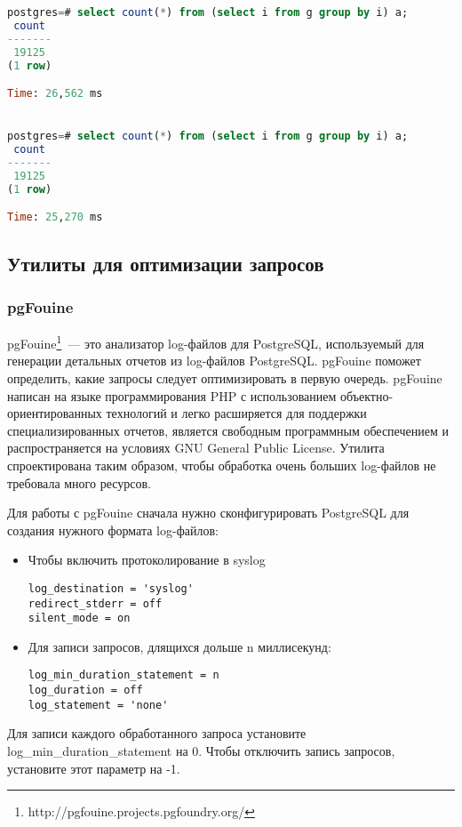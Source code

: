 \begin{lstlisting}[language=SQL,label=lst:sql_performance4,caption=GROUP BY]
postgres=# select count(*) from (select i from g group by i) a;
 count 
-------
 19125
(1 row)

Time: 26,562 ms


postgres=# select count(*) from (select i from g group by i) a;
 count 
-------
 19125
(1 row)

Time: 25,270 ms

\end{lstlisting}

\subsection{Утилиты для оптимизации запросов}
\subsubsection{pgFouine}
pgFouine\footnote{http://pgfouine.projects.pgfoundry.org/}~--- это 
анализатор log-файлов для PostgreSQL, используемый для генерации детальных отчетов из 
log-файлов PostgreSQL. pgFouine поможет определить, какие запросы следует оптимизировать в первую очередь.
pgFouine написан на языке программирования PHP с использованием объектно-ориентированных технологий и легко 
расширяется для поддержки специализированных отчетов, является свободным программным обеспечением и 
распространяется на условиях GNU General Public License. Утилита спроектирована таким образом, чтобы обработка 
очень больших log-файлов не требовала много ресурсов.

Для работы с pgFouine сначала нужно сконфигурировать PostgreSQL для создания нужного формата log-файлов:
\begin{itemize}
\item Чтобы включить протоколирование в syslog
\begin{lstlisting}[label=lst:sql_performance5,caption=pgFouine]
log_destination = 'syslog'
redirect_stderr = off
silent_mode = on
\end{lstlisting}
\item Для записи запросов, длящихся дольше n миллисекунд:
\begin{lstlisting}[label=lst:sql_performance6,caption=pgFouine]
log_min_duration_statement = n
log_duration = off
log_statement = 'none'
\end{lstlisting}
\end{itemize}

Для записи каждого обработанного запроса установите log\_min\_duration\_statement на 0. 
Чтобы отключить запись запросов, установите этот параметр на -1.

